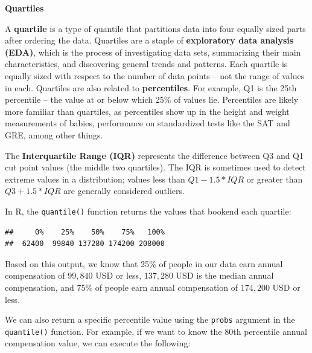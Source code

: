 \documentclass[
]{book}
\newenvironment{Shaded}{\begin{snugshade}}{\end{snugshade}}
\newcommand{\AttributeTok}[1]{\textcolor[rgb]{0.77,0.63,0.00}{#1}}
\newcommand{\CommentTok}[1]{\textcolor[rgb]{0.56,0.35,0.01}{\textit{#1}}}
\newcommand{\DecValTok}[1]{\textcolor[rgb]{0.00,0.00,0.81}{#1}}
\newcommand{\FunctionTok}[1]{\textcolor[rgb]{0.00,0.00,0.00}{#1}}
\newcommand{\NormalTok}[1]{#1}
\newcommand{\SpecialCharTok}[1]{\textcolor[rgb]{0.00,0.00,0.00}{#1}}
\begin{document}
\textbf{Quartiles}

A \textbf{quartile} is a type of quantile that partitions data into four equally sized parts after ordering the data. Quartiles are a staple of \textbf{exploratory data analysis (EDA)}, which is the process of investigating data sets, summarizing their main characteristics, and discovering general trends and patterns. Each quartile is equally sized with respect to the number of data points -- not the range of values in each. Quartiles are also related to \textbf{percentiles}. For example, Q1 is the 25th percentile -- the value at or below which 25\% of values lie. Percentiles are likely more familiar than quartiles, as percentiles show up in the height and weight measurements of babies, performance on standardized tests like the SAT and GRE, among other things.

The \textbf{Interquartile Range (IQR)} represents the difference between Q3 and Q1 cut point values (the middle two quartiles). The IQR is sometimes used to detect extreme values in a distribution; values less than \(Q1 - 1.5 * IQR\) or greater than \(Q3 + 1.5 * IQR\) are generally considered outliers.

In R, the \texttt{quantile()} function returns the values that bookend each quartile:

\begin{Shaded}
\end{Shaded}

\begin{verbatim}
##     0%    25%    50%    75%   100% 
##  62400  99840 137280 174200 208000
\end{verbatim}

Based on this output, we know that 25\% of people in our data earn annual compensation of \(99,840\) USD or less, \(137,280\) USD is the median annual compensation, and 75\% of people earn annual compensation of \(174,200\) USD or less.

We can also return a specific percentile value using the \texttt{probs} argument in the \texttt{quantile()} function. For example, if we want to know the 80th percentile annual compensation value, we can execute the following:

\begin{Shaded}
\end{Shaded}
\end{document}

